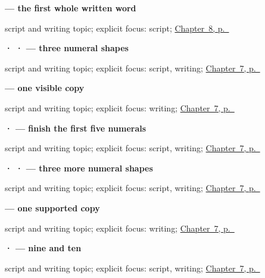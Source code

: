 \noindent\begin{minipage}[t]{\linewidth}
\raggedright
\textbf{ — the first whole written word}\par
\footnotesize script and writing topic; explicit focus: script; \hyperref[ch:ta-please]{Chapter~8, p.~\pageref*{ch:ta-please}}
\end{minipage}\par\smallskip

\noindent\begin{minipage}[t]{\linewidth}
\raggedright
\textbf{ ·  ·  — three numeral shapes}\par
\footnotesize script and writing topic; explicit focus: script, writing; \hyperref[ch:ta-numbers-one-to-ten]{Chapter~7, p.~\pageref*{ch:ta-numbers-one-to-ten}}
\end{minipage}\par\smallskip

\noindent\begin{minipage}[t]{\linewidth}
\raggedright
\textbf{     — one visible copy}\par
\footnotesize script and writing topic; explicit focus: writing; \hyperref[ch:ta-numbers-one-to-ten]{Chapter~7, p.~\pageref*{ch:ta-numbers-one-to-ten}}
\end{minipage}\par\smallskip

\noindent\begin{minipage}[t]{\linewidth}
\raggedright
\textbf{ ·  — finish the first five numerals}\par
\footnotesize script and writing topic; explicit focus: script, writing; \hyperref[ch:ta-numbers-one-to-ten]{Chapter~7, p.~\pageref*{ch:ta-numbers-one-to-ten}}
\end{minipage}\par\smallskip

\noindent\begin{minipage}[t]{\linewidth}
\raggedright
\textbf{ ·  ·  — three more numeral shapes}\par
\footnotesize script and writing topic; explicit focus: script, writing; \hyperref[ch:ta-numbers-one-to-ten]{Chapter~7, p.~\pageref*{ch:ta-numbers-one-to-ten}}
\end{minipage}\par\smallskip

\noindent\begin{minipage}[t]{\linewidth}
\raggedright
\textbf{     — one supported copy}\par
\footnotesize script and writing topic; explicit focus: writing; \hyperref[ch:ta-numbers-one-to-ten]{Chapter~7, p.~\pageref*{ch:ta-numbers-one-to-ten}}
\end{minipage}\par\smallskip

\noindent\begin{minipage}[t]{\linewidth}
\raggedright
\textbf{ ·  — nine and ten}\par
\footnotesize script and writing topic; explicit focus: script, writing; \hyperref[ch:ta-numbers-one-to-ten]{Chapter~7, p.~\pageref*{ch:ta-numbers-one-to-ten}}
\end{minipage}\par\smallskip
